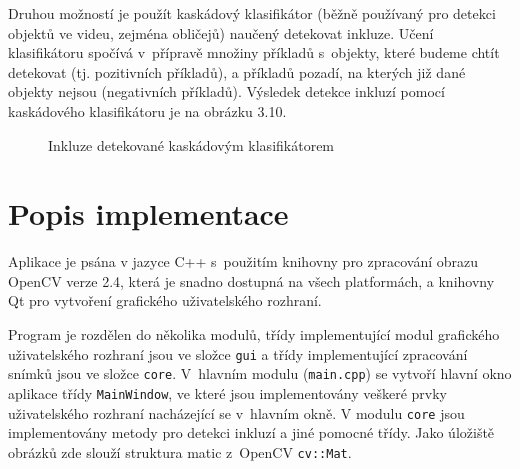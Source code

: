 \documentclass[12pt, a4paper]{report}
\begin{document}
Druhou možností je použít kaskádový klasifikátor (běžně používaný pro detekci objektů ve videu, zejména obličejů) naučený detekovat inkluze. Učení klasifikátoru spočívá v~přípravě množiny příkladů s~objekty, které budeme chtít detekovat (tj. pozitivních příkladů), a příkladů pozadí, na kterých již dané objekty nejsou (negativních příkladů). Výsledek detekce inkluzí pomocí kaskádového klasifikátoru je na obrázku 3.10.

\begin{figure}[!htb]
	\centering
	\label{fig:klasifikator}
	\caption{Inkluze detekované kaskádovým klasifikátorem}
	\end{figure}

\chapter{Popis implementace}
Aplikace je psána v jazyce C++ s~použitím knihovny pro zpracování obrazu OpenCV verze 2.4, která je snadno dostupná na všech platformách, a knihovny Qt pro vytvoření grafického uživatelského rozhraní.
	
	Program je rozdělen do několika modulů, třídy implementující modul grafického uživatelského rozhraní jsou ve složce \texttt{gui} a třídy implementující zpracování snímků jsou ve složce \texttt{core}. V~hlavním modulu (\texttt{main.cpp}) se vytvoří hlavní okno aplikace třídy \texttt{MainWindow}, ve které jsou implementovány veškeré prvky uživatelského rozhraní nacházející se v~hlavním okně. 
	V modulu \texttt{core} jsou implementovány metody pro detekci inkluzí a jiné pomocné třídy. Jako úložiště obrázků zde slouží struktura matic z~OpenCV \texttt{cv::Mat}.
\end{document}
